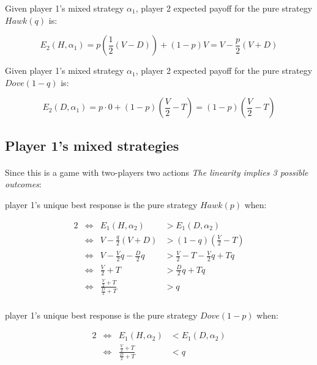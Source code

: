 \documentclass[letterpaper]{article}
\begin{document}
Given player 1’s mixed strategy $\alpha_1$, player 2 expected payoff
for the pure strategy $Hawk(q)$ is:

\begin{equation}
    E_2(H, \alpha_1) = p (\frac{1}{2}(V - D)) + (1 - p)V
    = V - \frac{p}{2}(V + D)
\end{equation}

Given player 1’s mixed strategy $\alpha_1$, player 2 expected payoff
for the pure strategy $Dove(1 - q)$ is:

\begin{equation}
    E_2(D, \alpha_1) = p \cdot 0 + (1 - p)(\frac{V}{2} - T)
    = (1 - p)(\frac{V}{2} - T)
\end{equation}

\subsection{Player 1's mixed strategies}

\paragraph{}

Since this is a game with two-players two actions
\textit{The linearity implies 3 possible outcomes}:

player 1’s unique best response is the pure strategy $Hawk(p)$ when:

    \begin{alignat*}{2}
    &\iff & E_1(H, \alpha_2) &> E_1(D, \alpha_2) \\
    &\iff &    V - \frac{q}{2}(V + D) &> (1 - q)(\frac{V}{2} - T) \\
    &\iff & V - \frac{V}{2}q - \frac{D}{2}q
    &> \frac{V}{2} - T - \frac{V}{2}q + Tq \\
    &\iff & \frac{V}{2} + T
    &> \frac{D}{2}q + Tq \\
    &\iff & \frac{\frac{V}{2} + T}{\frac{D}{2} + T}
    &> q \\
    \end{alignat*}

player 1’s unique best response is the pure strategy $Dove(1 - p)$ when:

        \begin{alignat*}{2}
        &\iff & E_1(H, \alpha_2) &< E_1(D, \alpha_2) \\
        &\iff & \frac{\frac{V}{2} + T}{\frac{D}{2} + T}
        &< q \\
        \end{alignat*}
\end{document}
